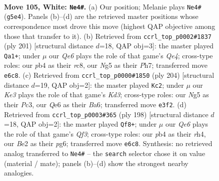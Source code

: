 \documentclass[11pt]{article}
\begin{document}
\clearpage

\begin{figure}[p]\centering
\begin{subfigure}{0.46\textwidth}\centering
\resizebox{\linewidth}{!}{%
\newchessgame
\chessboard[
  setfen={8/8/4Q3/2k3N1/1p6/4K3/4B3/8 w - - 3 105},
  showmover=false,
  pgfstyle=straightmove, color=movearrow, markmove={g5-e4}
]}
\caption{}
\end{subfigure}\hfill
\begin{subfigure}{0.46\textwidth}\centering
\resizebox{\linewidth}{!}{%
\newchessgame
\chessboard[
  setfen={2R5/7p/8/4q3/8/7P/4k1P1/7K b - - 62 101},
  showmover=false,
  pgfstyle=straightmove, color=movearrow, markmove={e5-a1}
]}
\caption{}
\end{subfigure}
\\[4pt]
\begin{subfigure}{0.46\textwidth}\centering
\resizebox{\linewidth}{!}{%
\newchessgame
\chessboard[
  setfen={6r1/8/B1pk4/8/8/2PK4/8/8 w - - 94 103},
  showmover=false,
  pgfstyle=straightmove, color=movearrow, markmove={d3-c2}
]}
\caption{}
\end{subfigure}\hfill
\begin{subfigure}{0.46\textwidth}\centering
\resizebox{\linewidth}{!}{%
\newchessgame
\chessboard[
  setfen={8/8/2K3pk/8/7r/5Q2/8/8 w - - 17 100},
  showmover=false,
  pgfstyle=straightmove, color=movearrow, markmove={f3-f8}
]}
\caption{}
\end{subfigure}
\caption{\textbf{Move 105, White: \texttt{Ne4\#}.} (a) Our position; Melanie plays \texttt{Ne4\#} (\texttt{g5e4}). Panels (b)--(d) are the retrieved master positions whose correspondence most drove this move (highest QAP objective among those that transfer to it). (b) Retrieved from \texttt{ccrl\_top\_p0002\#1837} (ply 201) [structural distance $d$=18, QAP obj=3]: the master played \texttt{Qa1+}; under $\mu$ our \emph{Qe6} plays the role of that game's \emph{Qe4}; cross-type roles: our \emph{p}b4 as their \emph{r}c8, our \emph{N}g5 as their \emph{P}h7; transferred move \texttt{e6c8}. (c) Retrieved from \texttt{ccrl\_top\_p0000\#1850} (ply 204) [structural distance $d$=19, QAP obj=2]: the master played \texttt{Kc2}; under $\mu$ our \emph{Ke3} plays the role of that game's \emph{Kd3}; cross-type roles: our \emph{N}g5 as their \emph{P}c3, our \emph{Q}e6 as their \emph{B}a6; transferred move \texttt{e3f2}. (d) Retrieved from \texttt{ccrl\_top\_p0003\#365} (ply 198) [structural distance $d$=18, QAP obj=2]: the master played \texttt{Qf8+}; under $\mu$ our \emph{Qe6} plays the role of that game's \emph{Qf3}; cross-type roles: our \emph{p}b4 as their \emph{r}h4, our \emph{B}e2 as their \emph{p}g6; transferred move \texttt{e6c8}. Synthesis: no retrieved analog transferred to \texttt{Ne4\#} -- the \texttt{search} selector chose it on value (material / mate); panels (b)--(d) show the strongest nearby analogies.}
\label{fig:thought-m208}
\end{figure}
\end{document}
